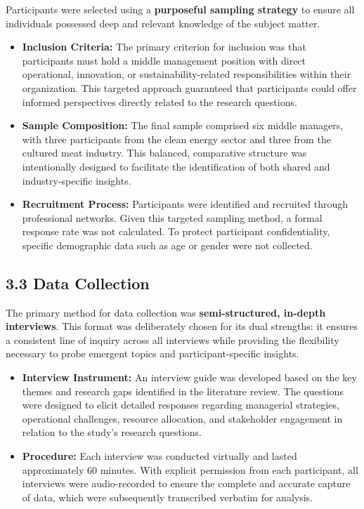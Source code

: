 Participants were selected using a \textbf{purposeful sampling strategy} to ensure all individuals possessed deep and relevant knowledge of the subject matter. 
\begin{itemize}
	\item \textbf{Inclusion Criteria:} The primary criterion for inclusion was that participants must hold a middle management position with direct operational, innovation, or sustainability-related responsibilities within their organization. This targeted approach guaranteed that participants could offer informed perspectives directly related to the research questions.
	\item \textbf{Sample Composition:} The final sample comprised six middle managers, with three participants from the clean energy sector and three from the cultured meat industry. This balanced, comparative structure was intentionally designed to facilitate the identification of both shared and industry-specific insights.
	\item \textbf{Recruitment Process:} Participants were identified and recruited through professional networks. Given this targeted sampling method, a formal response rate was not calculated. To protect participant confidentiality, specific demographic data such as age or gender were not collected.
\end{itemize}

\subsection*{3.3 Data Collection}

The primary method for data collection was \textbf{semi-structured, in-depth interviews}. This format was deliberately chosen for its dual strengths: it ensures a consistent line of inquiry across all interviews while providing the flexibility necessary to probe emergent topics and participant-specific insights.
\begin{itemize}
	\item \textbf{Interview Instrument:} An interview guide was developed based on the key themes and research gaps identified in the literature review. The questions were designed to elicit detailed responses regarding managerial strategies, operational challenges, resource allocation, and stakeholder engagement in relation to the study's research questions.
	\item \textbf{Procedure:} Each interview was conducted virtually and lasted approximately 60 minutes. With explicit permission from each participant, all interviews were audio-recorded to ensure the complete and accurate capture of data, which were subsequently transcribed verbatim for analysis.
\end{itemize}

